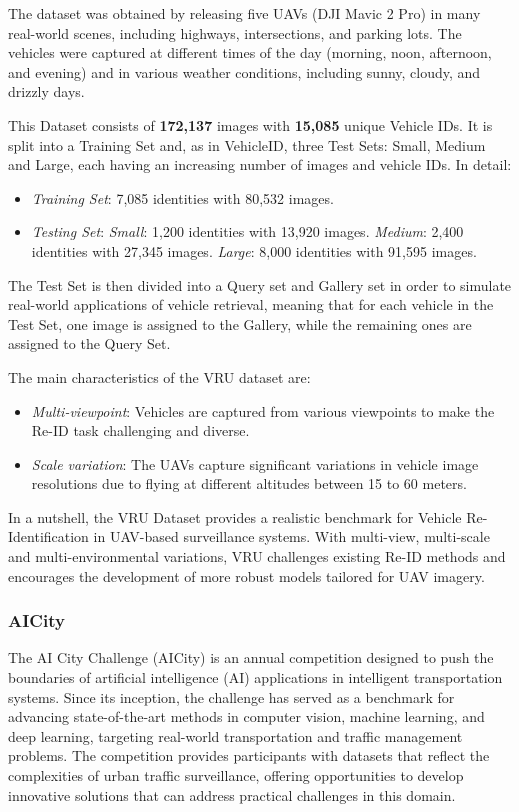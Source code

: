 The dataset was obtained by releasing five UAVs (DJI Mavic 2 Pro) in many real-world scenes, including highways, intersections, and parking lots. The vehicles were captured at different times of the day (morning, noon, afternoon, and evening) and in various weather conditions, including sunny, cloudy, and drizzly days.

This Dataset consists of \textbf{172,137} images with \textbf{15,085} unique Vehicle IDs. It is split into a Training Set and, as in VehicleID, three Test Sets: Small, Medium and Large, each having an increasing number of images and vehicle IDs. In detail:

\begin{itemize}
    \item \textit{Training Set}: 7,085 identities with 80,532 images.
    \item \textit{Testing Set}:
    \subitem \textit{Small}: 1,200 identities with 13,920 images.
    \subitem \textit{Medium}: 2,400 identities with 27,345 images.
    \subitem \textit{Large}: 8,000 identities with 91,595 images.
\end{itemize}

The Test Set is then divided into a Query set and Gallery set in order to simulate real-world applications of vehicle retrieval, meaning that for each vehicle in the Test Set, one image is assigned to the Gallery, while the remaining ones are assigned to the Query Set.

The main characteristics of the VRU dataset are:
\begin{itemize}
    \item \textit{Multi-viewpoint}: Vehicles are captured from various viewpoints to make the Re-ID task challenging and diverse.
    \item \textit{Scale variation}: The UAVs capture significant variations in vehicle image resolutions due to flying at different altitudes between 15 to 60 meters.
\end{itemize}

In a nutshell, the VRU Dataset provides a realistic benchmark for Vehicle Re-Identification in UAV-based surveillance systems. With multi-view, multi-scale and multi-environmental variations, VRU challenges existing Re-ID methods and encourages the development of more robust models tailored for UAV imagery.

\subsubsection{AICity}
The AI City Challenge (AICity) \cite{CityFlow, AICityChallenge} is an annual competition designed to push the boundaries of artificial intelligence (AI) applications in intelligent transportation systems. Since its inception, the challenge has served as a benchmark for advancing state-of-the-art methods in computer vision, machine learning, and deep learning, targeting real-world transportation and traffic management problems. The competition provides participants with datasets that reflect the complexities of urban traffic surveillance, offering opportunities to develop innovative solutions that can address practical challenges in this domain.

